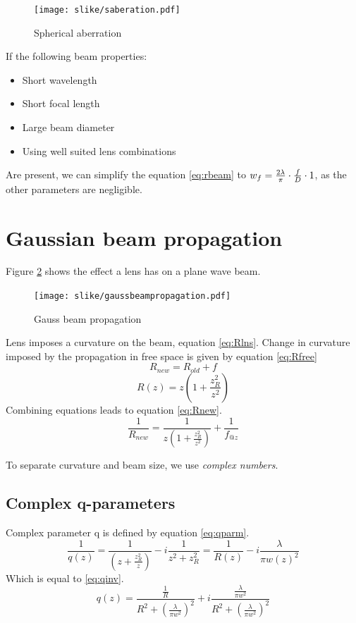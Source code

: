 \begin{figure}[h!]
    \centering
    \texttt{[image: slike/saberation.pdf]}
    \caption{Spherical aberration}
    \label{fig:saber}
\end{figure}

If the following beam properties:
\begin{itemize}
    \item Short wavelength
    \item Short focal length
    \item Large beam diameter
    \item Using well suited lens combinations
\end{itemize}
Are present, we can simplify the equation \ref{eq:rbeam} to $w_f = \textcolor{black}{\frac{2\lambda}{\pi} \cdot \frac{f}{D} \cdot 1}$, as the other parameters are negligible.

\section{Gaussian beam propagation}

Figure \ref{fig:gbp} shows the effect a lens has on a  plane wave beam.
\begin{figure}[h!]
    \centering
    \texttt{[image: slike/gaussbeampropagation.pdf]}
    \caption{Gauss beam propagation}
    \label{fig:gbp}
\end{figure}

Lens imposes a curvature on the beam, equation \ref{eq:Rlns}. Change in curvature imposed by the propagation in free space
is given by equation \ref{eq:Rfree}
\begin{equation}
    R_{new} = R_{old} + f
    \label{eq:Rlns}
\end{equation}
\begin{equation}
    R(z) = z (1 + \frac{z_R^2}{z^2})
    \label{eq:Rfree}
\end{equation}
Combining equations leads to equation \ref{eq:Rnew}.
\begin{equation}
    \frac{1}{R_{new}} = \frac{1}{z (1 + \frac{z_R^2}{z^2})} + \frac{1}{f_{@z}}
    \label{eq:Rnew}
\end{equation}

To separate curvature and beam size, we use \textit{complex numbers}.

\subsection{Complex q-parameters}
Complex parameter q is defined by equation \ref{eq:qparm}.
\begin{equation}
    \frac{1}{q(z)} = \frac{1}{(z + \frac{z_R^2}{z})} - i \frac{1}{z^2 + z_R^2} = \frac{1}{R(z)} - i \frac{\lambda}{\pi w(z)^2}
    \label{eq:qparm}
\end{equation}
Which is equal to \ref{eq:qinv}.
\begin{equation}
    q(z) = \frac{\frac{1}{R}}{R^2 + (\frac{\lambda}{\pi w^2})^2} + i \frac{\frac{\lambda}{\pi w^2}}{R^2 + (\frac{\lambda}{\pi w^2})^2}
    \label{eq:qinv}
\end{equation}

